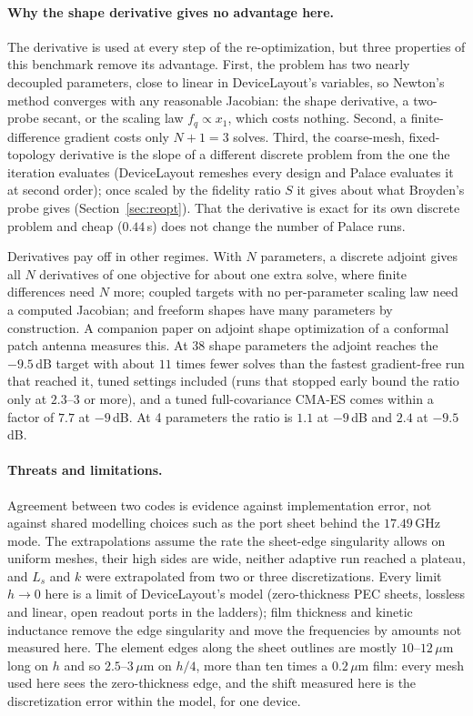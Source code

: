 \documentclass{anvil-paper}
\begin{document}
\paragraph{Why the shape derivative gives no advantage here.}
The derivative is used at every step of the re-optimization, but three
properties of this benchmark remove its advantage. First, the problem has
two nearly decoupled parameters, close to linear in DeviceLayout's
variables, so Newton's method converges with any reasonable Jacobian: the
shape derivative, a two-probe secant, or the scaling law $f_q \propto x_1$,
which costs nothing. Second, a finite-difference gradient costs only $N+1 =
3$ solves. Third, the coarse-mesh, fixed-topology derivative is the slope
of a different discrete problem from the one the iteration evaluates
(DeviceLayout remeshes every design and Palace evaluates it at second
order); once scaled by the fidelity ratio $S$ it gives about what
Broyden's probe gives (Section~\ref{sec:reopt}). That the derivative is exact for its own
discrete problem and cheap ($0.44$\,s) does not change the number of
Palace runs.

Derivatives pay off in other regimes. With $N$ parameters, a discrete
adjoint gives all $N$ derivatives of one objective for about one extra
solve, where finite differences need $N$ more; coupled targets with no
per-parameter scaling law need a computed Jacobian; and freeform shapes
have many parameters by construction. A companion paper on adjoint shape
optimization of a conformal patch antenna \citep{walters2026conformal}
measures this. At 38 shape parameters the adjoint reaches the $-9.5$\,dB
target with about $11$ times fewer solves than the fastest gradient-free
run that reached it, tuned settings included (runs that stopped early
bound the ratio only at $2.3$--$3$ or more), and a tuned full-covariance
CMA-ES comes within a factor of $7.7$ at $-9$\,dB. At 4 parameters the
ratio is $1.1$ at $-9$\,dB and $2.4$ at $-9.5$\,dB.

\paragraph{Threats and limitations.}
Agreement between two codes is evidence against implementation error, not
against shared modelling choices such as the port sheet behind the
$17.49$\,GHz mode. The extrapolations assume the rate the sheet-edge
singularity allows on uniform meshes, their high sides are wide, neither
adaptive run reached a plateau, and $L_s$ and $k$ were extrapolated from
two or three discretizations. Every limit $h \to 0$ here is a limit of
DeviceLayout's model (zero-thickness PEC sheets, lossless and linear, open
readout ports in the ladders); film thickness and kinetic inductance remove
the edge singularity and move the frequencies by amounts not measured
here. The element edges
along the sheet outlines are mostly $10$--$12\,\mu$m long on $h$ and so
$2.5$--$3\,\mu$m on $h/4$, more than ten times a $0.2\,\mu$m film: every
mesh used here sees the zero-thickness edge, and the shift measured here
is the discretization error within the model, for one device.
\end{document}
